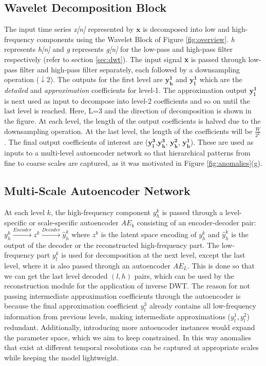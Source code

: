 \subsection{Wavelet Decomposition Block} 
The input time series  {\em x[n]} represented by $\textbf{x}$ is decomposed into low and high-frequency components using
the Wavelet Block of Figure \ref{fig:overview}. \emph{h} represents {\em h[n]} and \emph{g} represents {\em g[n]} for
the low-pass and high-pass filter respectively (refer to section \ref{sec:dwt}). The input signal \textbf{x} is passed
through low-pass filter  and high-pass filter separately, each followed by a downsampling operation ($\downarrow2$). The
outputs for the first level are $\mathbf{y_h^1}$ and $\mathbf{y_l^1}$ which are the \emph{detailed} and
\emph{approximation} coefficients for level-1. The approximation output $\mathbf{y_l^1}$ is next used as input to
decompose into level-2 coefficients and so on until the last level is reached. Here, L=3 and the direction of
decomposition is shown in the figure. At each level, the length of the output coefficients is halved due to the
downsampling operation. At the last level, the length of the coefficients will be $\frac{W}{2^L}$. The final output
coefficients of interest are ($\mathbf{y_l^3}$,$\mathbf{y_h^3}$, $\mathbf{y_h^2}$, $\mathbf{y_h^1}$). These are used as
inputs to a multi-level autoencoder network so that hierarchical patterns from fine to coarse scales are captured, as it was motivated in Figure \ref{fig:anomalies}(g). 

\subsection{Multi-Scale Autoencoder Network}
At each level $k$, the high-frequency component $y_h^k$ is passed through a level-specific or scale-specific autoencoder
$AE_k$ consisting of an encoder-decoder pair: $y_h^k \xrightarrow{Encoder} z^k \xrightarrow{Decoder} \hat{y}_h^k$ where
$z^k$ is the latent space encoding of $y_h^k$ and $\hat{y}_h^k $ is the output of the decoder or the reconstructed
high-frequency part. The low-frequency part $y_l^k $ is used for decomposition at the next level, except the last level,
where it is also passed through an autoencoder $AE_L$. This is done so that we can get the last level decoded $(l,h)$
pairs, which can be used by the reconstruction module for the application of inverse DWT. The reason for not passing
intermediate approximation coefficients through the autoencoder is because the final approximation coefficient $y_l^3$
already contains all low-frequency information from previous levels, making intermediate approximations ($y_l^1, y_l^2$)
redundant. Additionally, introducing more autoencoder instances would expand the parameter space, which we aim to keep
constrained.  In this way anomalies that exist at different temporal resolutions can be captured at appropriate scales
while keeping the model lightweight. 

